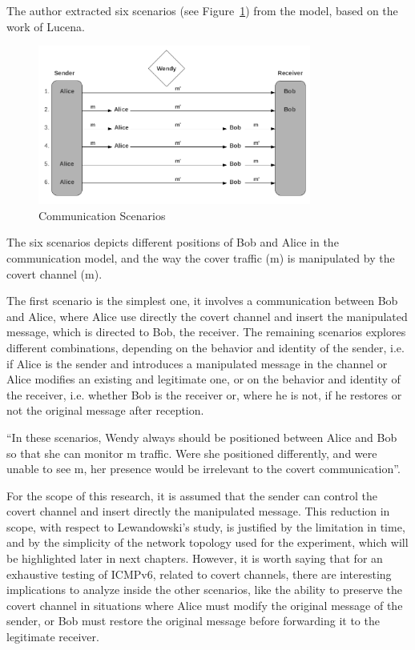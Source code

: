 \documentclass[12pt]{article}
\begin{document}
The author extracted six scenarios (see Figure~\ref{fig:commScenarios}) from the model, based on the work of Lucena\cite{lucena}.

\begin{figure}[ht] 
\begin{center}
\includegraphics[width=0.8\textwidth]{communicationScenarios}
\caption{Communication Scenarios\cite{lewandowski}}
\label{fig:commScenarios}
\end{center}
\end{figure}

The six scenarios depicts different positions of Bob and Alice in the communication model, and the way the cover traffic (m) is manipulated by the covert channel (m\textprime).

The first scenario is the simplest one, it involves a communication between Bob and Alice, where Alice use directly the covert channel and insert the manipulated message, which is directed to Bob, the receiver. The remaining scenarios explores different combinations, depending on the behavior and identity of the sender, i.e. if Alice is the sender and introduces a manipulated message in the channel or Alice modifies an existing and legitimate one, or on the behavior and identity of the receiver, i.e. whether Bob is the receiver or, where he is not, if he restores or not the original message after reception.

``In these scenarios, Wendy always should be positioned between Alice and Bob so that she can monitor m\textprime\hspace{2pt} traffic. Were she positioned differently, and were unable to see m\textprime, her presence would be irrelevant to the covert communication''\cite{lewandowski}.

For the scope of this research, it is assumed that the sender can control the covert channel and insert directly the manipulated message. This reduction in scope, with respect to Lewandowski's study, is justified by the limitation in time, and by the simplicity of the network topology used for the experiment, which will be highlighted later in next chapters. However, it is worth saying that for an exhaustive testing of ICMPv6, related to covert channels, there are interesting implications to analyze inside the other scenarios, like the ability to preserve the covert channel in situations where Alice must modify the original message of the sender, or Bob must restore the original message before forwarding it to the legitimate receiver.
\end{document}
